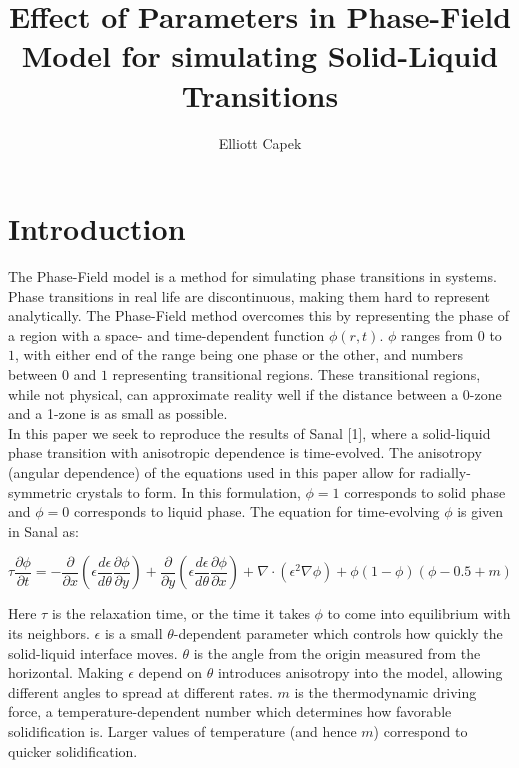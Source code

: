 \documentclass[10pt]{article} %
\title{Effect of Parameters in Phase-Field Model for simulating Solid-Liquid Transitions}
\author{Elliott Capek}
\begin{document}
\maketitle{}

\section{Introduction}
The Phase-Field model is a method for simulating phase transitions in systems. Phase transitions in real life are discontinuous, making them hard to represent analytically. The Phase-Field method overcomes this by representing the phase of a region with a space- and time-dependent function $\phi(r,t)$. $\phi$ ranges from $0$ to $1$, with either end of the range being one phase or the other, and numbers between $0$ and $1$ representing transitional regions. These transitional regions, while not physical, can approximate reality well if the distance between a 0-zone and a 1-zone is as small as possible. \\

In this paper we seek to reproduce the results of Sanal [1], where a solid-liquid phase transition with anisotropic dependence is time-evolved. The anisotropy (angular dependence) of the equations used in this paper allow for radially-symmetric crystals to form. In this formulation, $\phi=1$ corresponds to solid phase and $\phi=0$ corresponds to liquid phase. The equation for time-evolving $\phi$ is given in Sanal as:

\begin{equation}  \label{eq:dPhidt}
  \tau \frac{\partial \phi}{\partial t} = -\frac{\partial}{\partial x} \left(\epsilon \frac{d\epsilon}{d\theta}\frac{\partial\phi}{\partial y}\right) + \frac{\partial}{\partial y} \left(\epsilon \frac{d\epsilon}{d\theta}\frac{\partial \phi}{\partial x}\right) + \nabla \cdot \left(\epsilon^2\nabla\phi\right) + \phi\left(1-\phi\right)\left(\phi-0.5+m\right)
\end{equation}

Here $\tau$ is the relaxation time, or the time it takes $\phi$ to come into equilibrium with its neighbors. $\epsilon$ is a small $\theta$-dependent parameter which controls how quickly the solid-liquid interface moves. $\theta$ is the angle from the origin measured from the horizontal. Making $\epsilon$ depend on $\theta$ introduces anisotropy into the model, allowing different angles to spread at different rates. $m$ is the thermodynamic driving force, a temperature-dependent number which determines how favorable solidification is. Larger values of temperature (and hence $m$) correspond to quicker solidification. \\
\end{document}
